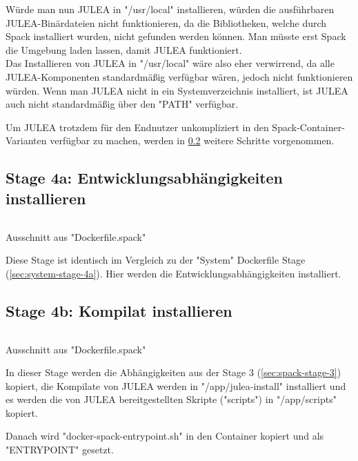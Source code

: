 Würde man nun JULEA in "/usr/local" installieren, würden die ausführbaren JULEA-Binärdateien nicht funktionieren, da die Bibliotheken, welche durch Spack installiert wurden, nicht gefunden werden können. Man müsste erst Spack die Umgebung laden lassen, damit JULEA funktioniert. \\
Das Installieren von JULEA in "/usr/local" wäre also eher verwirrend, da alle JULEA-Komponenten standardmäßig verfügbar wären, jedoch nicht funktionieren würden. Wenn man JULEA nicht in ein Systemverzeichnis installiert, ist JULEA auch nicht standardmäßig über den "PATH" verfügbar. 

Um JULEA trotzdem für den Endnutzer unkompliziert in den Spack-Container-Varianten verfügbar zu machen, werden in \cref{sec:spack-stage-4b} weitere Schritte vorgenommen.

\subsection{Stage 4a: Entwicklungsabhängigkeiten installieren} \label{sec:spack-stage-4a}

\begin{listing}[H]
\inputminted[firstline=51,lastline=55]{dockerfile}{./code-examples/Dockerfile.spack}
\caption{Ausschnitt aus "Dockerfile.spack"}
\end{listing}

Diese Stage ist identisch im Vergleich zu der "System" Dockerfile Stage (\cref{sec:system-stage-4a}). Hier werden die Entwicklungsabhängigkeiten installiert.

\subsection{Stage 4b: Kompilat installieren} \label{sec:spack-stage-4b}

\begin{listing}[H]
\inputminted[firstline=42,lastline=48]{dockerfile}{./code-examples/Dockerfile.spack}
\caption{Ausschnitt aus "Dockerfile.spack"}
\end{listing}


In dieser Stage werden die Abhängigkeiten aus der Stage 3 (\cref{sec:spack-stage-3}) kopiert, die Kompilate von JULEA werden in "/app/julea-install" installiert und es werden die von JULEA bereitgestellten Skripte ("scripts") in "/app/scripts" kopiert.

Danach wird "docker-spack-entrypoint.sh" in den Container kopiert und als "ENTRYPOINT" gesetzt. 

